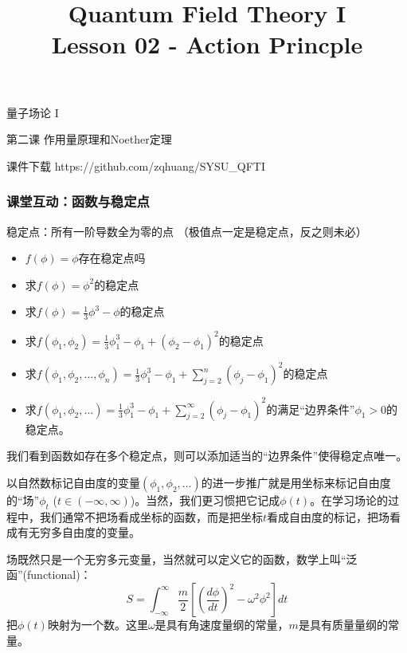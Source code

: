 \documentclass[CJK]{beamer}
\title{Quantum Field Theory I \\ Lesson 02 - Action Princple}
\author{}
\date{}
\begin{document}
\begin{frame}
 
\begin{center}
\begin{Large}
\bch
量子场论 I 

{\vskip 0.3in}

第二课 作用量原理和Noether定理

\ech
\end{Large}
\end{center}

\vskip 0.2in

\bch
课件下载
\ech
https://github.com/zqhuang/SYSU\_QFTI

\end{frame}


\begin{frame}
\frametitle{\bch 课堂互动：函数与稳定点 \ech}
\bch
稳定点：所有一阶导数全为零的点 （极值点一定是稳定点，反之则未必）
\begin{itemize}
\item{$f(\phi) = \phi$存在稳定点吗}
\item{求$f(\phi) = \phi^2$的稳定点}
\item{求$f(\phi) = \frac{1}{3}\phi^3-\phi$的稳定点}
\item{求$f(\phi_1, \phi_2) = \frac{1}{3}\phi_1^3 - \phi_1 + (\phi_2-\phi_1)^2$的稳定点}
\item{求$f(\phi_1, \phi_2, \ldots, \phi_n) = \frac{1}{3}\phi_1^3 - \phi_1 + \sum_{j=2}^n(\phi_j - \phi_1)^2$的稳定点}
\item{求$f(\phi_1, \phi_2, \ldots) = \frac{1}{3}\phi_1^3 - \phi_1 + \sum_{j=2}^\infty(\phi_j - \phi_1)^2$的满足“边界条件”$\phi_1>0$的稳定点。}
\end{itemize}

\skipline

我们看到函数如存在多个稳定点，则可以添加适当的“边界条件”使得稳定点唯一。

\ech
\end{frame}

\begin{frame}
\bch
以自然数标记自由度的变量$(\phi_1, \phi_2, \ldots)$的进一步推广就是用坐标来标记自由度的“场”$\phi_t$ ($t\in (-\infty, \infty)$)。当然，我们更习惯把它记成$\phi(t)$。在学习场论的过程中，我们通常不把场看成坐标的函数，而是把坐标$t$看成自由度的标记，把场看成有无穷多自由度的变量。

\skipline

场既然只是一个无穷多元变量，当然就可以定义它的函数，数学上叫“泛函”(functional)：
\ech
\bex
\bch
$$ S = \int_{-\infty}^\infty \frac{m}{2}\left[(\frac{d\phi}{dt})^2 - \omega^2\phi^2\right] dt$$
把$\phi(t)$映射为一个数。这里$\omega$是具有角速度量纲的常量，$m$是具有质量量纲的常量。
\ech
\eex
\end{frame}
\end{document}
